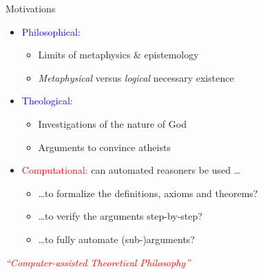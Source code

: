 \begin{frame}{Motivations} \Large
\begin{itemize}
\item \textcolor{blue}{Philosophical:} 
  \begin{itemize}
  \item Limits of metaphysics \& epistemology
  \item \emph{Metaphysical} versus \emph{logical} necessary existence \\[2em]
  \end{itemize} 
\item \textcolor{blue}{Theological:} 
  \begin{itemize}
  \item Investigations of the nature of God
  \item Arguments to convince atheists \\[2em]
  \end{itemize}
\item \textcolor{red}{Computational:} can automated reasoners be used \ldots
  \begin{itemize}
  \item \ldots to formalize the definitions, axioms and theorems?
  \item \ldots to verify the arguments step-by-step?
  \item \ldots to fully automate (sub-)arguments? \\[2em]
  \end{itemize}
\end{itemize}

\begin{center}
  \textcolor{red}{\emph{``Computer-assisted Theoretical Philosophy''}}
\end{center}
\end{frame}
